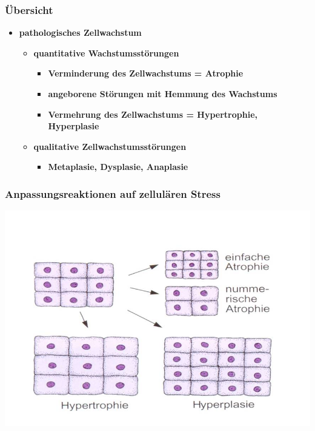 \subsubsection{Übersicht}
	\begin{itemize}
		\item \textbf{pathologisches Zellwachstum}
			\begin{itemize}
				\item \textbf{quantitative Wachstumsstörungen}
					\begin{itemize}
						\item \textbf{Verminderung des Zellwachstums = Atrophie}
						\item \textbf{angeborene Störungen mit Hemmung des Wachstums}
						\item \textbf{Vermehrung des Zellwachstums = Hypertrophie, Hyperplasie}
					\end{itemize}
				\item \textbf{qualitative Zellwachstumsstörungen}
					\begin{itemize}
						\item \textbf{Metaplasie, Dysplasie, Anaplasie}
					\end{itemize}
			\end{itemize}
	\end{itemize}

\subsubsection{Anpassungsreaktionen auf zellulären Stress}
	\begin{center}
		\includegraphics[scale=0.5]{Picture1.jpg}
	\end{center}

